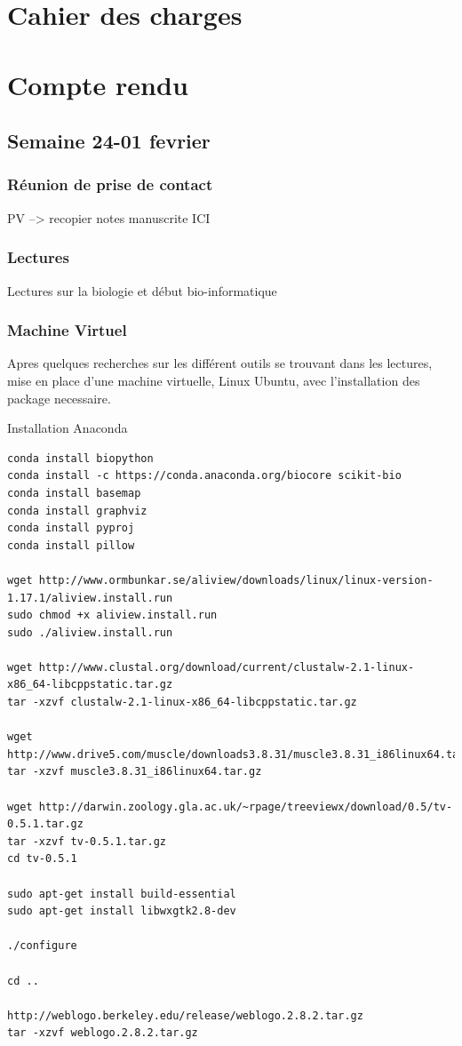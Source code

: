 \documentclass[a4paper,11pt]{report}
\begin{document}
\tableofcontents


\chapter{Cahier des charges}
 

\chapter{Compte rendu}

\section{Semaine 24-01 fevrier}
\subsection{Réunion de prise de contact}
\todo PV --> recopier notes manuscrite ICI

\subsection{Lectures}
Lectures sur la biologie et début bio-informatique

\subsection{Machine Virtuel}
Apres quelques recherches sur les différent outils se trouvant dans les lectures, mise en place d'une machine virtuelle, Linux Ubuntu, avec l'installation des package necessaire.



Installation Anaconda

\begin{verbatim}
conda install biopython
conda install -c https://conda.anaconda.org/biocore scikit-bio
conda install basemap
conda install graphviz
conda install pyproj
conda install pillow

wget http://www.ormbunkar.se/aliview/downloads/linux/linux-version-1.17.1/aliview.install.run
sudo chmod +x aliview.install.run
sudo ./aliview.install.run 

wget http://www.clustal.org/download/current/clustalw-2.1-linux-x86_64-libcppstatic.tar.gz
tar -xzvf clustalw-2.1-linux-x86_64-libcppstatic.tar.gz

wget http://www.drive5.com/muscle/downloads3.8.31/muscle3.8.31_i86linux64.tar.gz
tar -xzvf muscle3.8.31_i86linux64.tar.gz

wget http://darwin.zoology.gla.ac.uk/~rpage/treeviewx/download/0.5/tv-0.5.1.tar.gz
tar -xzvf tv-0.5.1.tar.gz
cd tv-0.5.1

sudo apt-get install build-essential
sudo apt-get install libwxgtk2.8-dev

./configure

cd ..

http://weblogo.berkeley.edu/release/weblogo.2.8.2.tar.gz
tar -xzvf weblogo.2.8.2.tar.gz
\end{verbatim}
\end{document}

